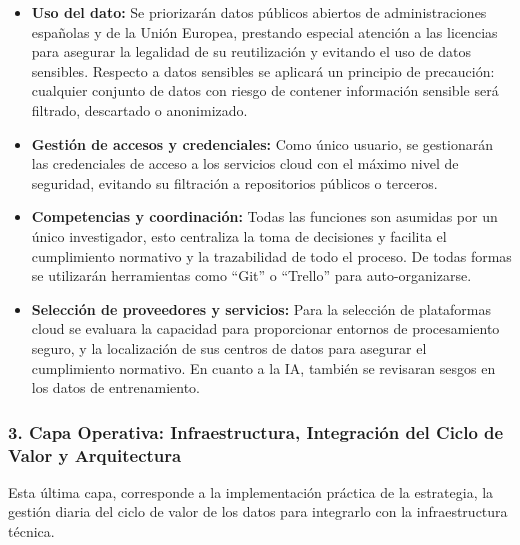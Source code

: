 \begin{itemize}
	\item \textbf{Uso del dato:} Se priorizarán datos públicos abiertos de administraciones españolas y de la Unión Europea, prestando especial atención a las licencias para asegurar la legalidad de su reutilización y evitando el uso de datos sensibles. Respecto a datos sensibles se aplicará un principio de precaución: cualquier conjunto de datos con riesgo de contener información sensible será filtrado, descartado o anonimizado. 
	
    \item \textbf{Gestión de accesos y credenciales:} Como único usuario, se gestionarán las credenciales de acceso a los servicios cloud con el máximo nivel de seguridad, evitando su filtración a repositorios públicos o terceros.
    
    \item \textbf{Competencias y coordinación:} Todas las funciones son asumidas por un único investigador, esto centraliza la toma de decisiones y facilita el cumplimiento normativo y la trazabilidad de todo el proceso. De todas formas se utilizarán herramientas como ``Git'' o ``Trello'' para auto-organizarse.
    
	\item \textbf{Selección de proveedores y servicios:} Para la selección de plataformas cloud se evaluara la capacidad para proporcionar entornos de procesamiento seguro, y la localización de sus centros de datos para asegurar el cumplimiento normativo. En cuanto a la IA, también se revisaran sesgos en los datos de entrenamiento.
\end{itemize}

\subsubsection*{3. Capa Operativa: Infraestructura, Integración del Ciclo de Valor y Arquitectura}
Esta última capa, corresponde a la implementación práctica de la estrategia, la gestión diaria del ciclo de valor de los datos para integrarlo con la infraestructura técnica.


